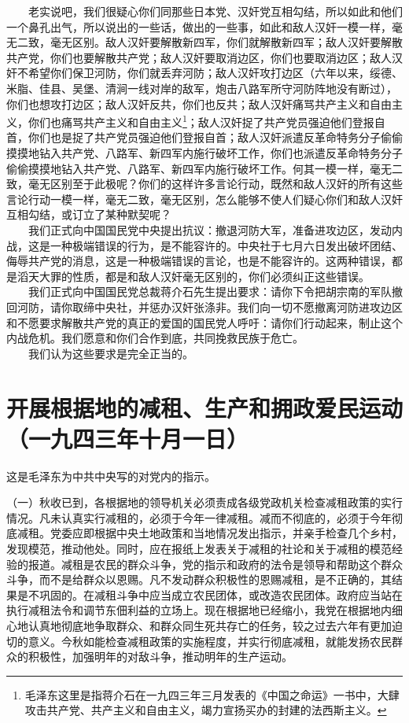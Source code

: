 \documentclass[cn,11pt,chinese]{elegantbook}
\def\myformat#1{\hfil\hfil #1}
\begin{document}
　　老实说吧，我们很疑心你们同那些日本党、汉奸党互相勾结，所以如此和他们一个鼻孔出气，所以说出的一些话，做出的一些事，如此和敌人汉奸一模一样，毫无二致，毫无区别。敌人汉奸要解散新四军，你们就解散新四军；敌人汉奸要解散共产党，你们也要解散共产党；敌人汉奸要取消边区，你们也要取消边区；敌人汉奸不希望你们保卫河防，你们就丢弃河防；敌人汉奸攻打边区（六年以来，绥德、米脂、佳县、吴堡、清涧一线对岸的敌军，炮击八路军所守河防阵地没有断过），你们也想攻打边区；敌人汉奸反共，你们也反共；敌人汉奸痛骂共产主义和自由主义，你们也痛骂共产主义和自由主义\footnote[4]{ 毛泽东这里是指蒋介石在一九四三年三月发表的《中国之命运》一书中，大肆攻击共产党、共产主义和自由主义，竭力宣扬买办的封建的法西斯主义。}；敌人汉奸捉了共产党员强迫他们登报自首，你们也是捉了共产党员强迫他们登报自首；敌人汉奸派遣反革命特务分子偷偷摸摸地钻入共产党、八路军、新四军内施行破坏工作，你们也派遣反革命特务分子偷偷摸摸地钻入共产党、八路军、新四军内施行破坏工作。何其一模一样，毫无二致，毫无区别至于此极呢？你们的这样许多言论行动，既然和敌人汉奸的所有这些言论行动一模一样，毫无二致，毫无区别，怎么能够不使人们疑心你们和敌人汉奸互相勾结，或订立了某种默契呢？\\
　　我们正式向中国国民党中央提出抗议：撤退河防大军，准备进攻边区，发动内战，这是一种极端错误的行为，是不能容许的。中央社于七月六日发出破坏团结、侮辱共产党的消息，这是一种极端错误的言论，也是不能容许的。这两种错误，都是滔天大罪的性质，都是和敌人汉奸毫无区别的，你们必须纠正这些错误。\\
　　我们正式向中国国民党总裁蒋介石先生提出要求：请你下令把胡宗南的军队撤回河防，请你取缔中央社，并惩办汉奸张涤非。我们向一切不愿撤离河防进攻边区和不愿要求解散共产党的真正的爱国的国民党人呼吁：请你们行动起来，制止这个内战危机。我们愿意和你们合作到底，共同挽救民族于危亡。\\
　　我们认为这些要求是完全正当的。\\
\newpage\section*{\myformat{开展根据地的减租、生产和拥政爱民运动}\\\myformat{（一九四三年十月一日）}}
\begin{introduction}\item  这是毛泽东为中共中央写的对党内的指示。\end{introduction}
（一）秋收已到，各根据地的领导机关必须责成各级党政机关检查减租政策的实行情况。凡未认真实行减租的，必须于今年一律减租。减而不彻底的，必须于今年彻底减租。党委应即根据中央土地政策和当地情况发出指示，并亲手检查几个乡村，发现模范，推动他处。同时，应在报纸上发表关于减租的社论和关于减租的模范经验的报道。减租是农民的群众斗争，党的指示和政府的法令是领导和帮助这个群众斗争，而不是给群众以恩赐。凡不发动群众积极性的恩赐减租，是不正确的，其结果是不巩固的。在减租斗争中应当成立农民团体，或改造农民团体。政府应当站在执行减租法令和调节东佃利益的立场上。现在根据地已经缩小，我党在根据地内细心地认真地彻底地争取群众、和群众同生死共存亡的任务，较之过去六年有更加迫切的意义。今秋如能检查减租政策的实施程度，并实行彻底减租，就能发扬农民群众的积极性，加强明年的对敌斗争，推动明年的生产运动。\\
\end{document}
